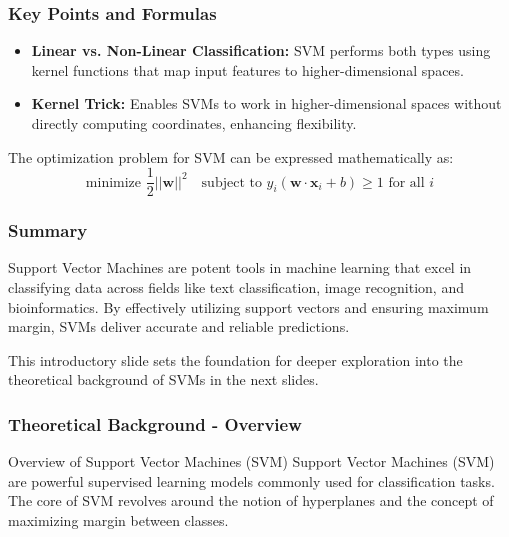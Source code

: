 \documentclass{beamer}
\begin{document}
\begin{frame}[fragile]
    \frametitle{Key Points and Formulas}
    \begin{itemize}
        \item \textbf{Linear vs. Non-Linear Classification:} 
        SVM performs both types using kernel functions that map input features to higher-dimensional spaces.
        
        \item \textbf{Kernel Trick:} 
        Enables SVMs to work in higher-dimensional spaces without directly computing coordinates, enhancing flexibility.
    \end{itemize}

    The optimization problem for SVM can be expressed mathematically as:
    \begin{equation}
        \text{minimize } \frac{1}{2} ||\mathbf{w}||^2 \quad \text{subject to } y_i (\mathbf{w} \cdot \mathbf{x}_i + b) \geq 1 \text{ for all } i
    \end{equation}
\end{frame}

\begin{frame}[fragile]
    \frametitle{Summary}
    Support Vector Machines are potent tools in machine learning that excel in classifying data across fields like text classification, image recognition, and bioinformatics. By effectively utilizing support vectors and ensuring maximum margin, SVMs deliver accurate and reliable predictions.
    
    This introductory slide sets the foundation for deeper exploration into the theoretical background of SVMs in the next slides.
\end{frame}

\begin{frame}[fragile]
    \frametitle{Theoretical Background - Overview}
    \begin{block}{Overview of Support Vector Machines (SVM)}
        Support Vector Machines (SVM) are powerful supervised learning models commonly used for classification tasks. 
        The core of SVM revolves around the notion of hyperplanes and the concept of maximizing margin between classes.
    \end{block}
\end{frame}
\end{document}
